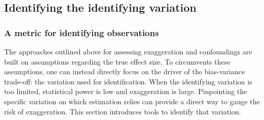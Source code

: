 \documentclass[usletter, 12pt]{article}
\begin{document}
		\subsection{Identifying the identifying variation}
		
			\subsubsection{A metric for identifying observations}
				
				
				
				The approaches outlined above for assessing exaggeration and confoundings are built on assumptions regarding the true effect size. To circumvents these assumptions, one can instead directly focus on the driver of the bias-variance trade-off: the variation used for identification. When the identifying variation is too limited, statistical power is low and exaggeration is large. Pinpointing the specific variation on which estimation relies can provide a direct way to gauge the risk of exaggeration. This section introduces tools to identify that variation.
			
\end{document}
